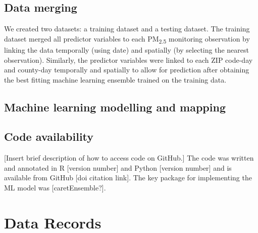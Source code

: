 \documentclass[english]{article}
\begin{document}

\subsection*{Data merging}
We created two datasets: a training dataset and a testing dataset. The training dataset merged all predictor variables to each PM\textsubscript{2.5} monitoring observation by linking the data temporally (using date) and spatially (by selecting the nearest observation). Similarly, the predictor variables were linked to each ZIP code-day and county-day temporally and spatially to allow for prediction after obtaining the best fitting machine learning ensemble trained on the training data. 

\subsection*{Machine learning modelling and mapping}


\subsection*{Code availability}


[Insert brief description of how to access code on GitHub.] The code was written and annotated in R [version number] and Python [version number] and is available from GitHub [doi citation link]. The key package for implementing the ML model was [caretEnsemble?]. 

\section*{Data Records}

\end{document}
